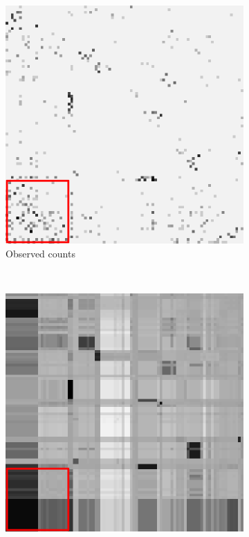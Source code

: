\documentclass{article}
\begin{document}
\begin{figure}[t]
\centering
\begin{subfigure}[b]{0.22\textwidth}
\centering
\includegraphics[scale=.25]{../figs/eckmann-small/parmat/observed}
\caption{Observed counts}
\end{subfigure}
~
\begin{subfigure}[b]{0.22\textwidth}
\centering
\includegraphics[scale=.25]{../figs/eckmann-small/parmat/1}

\end{subfigure}
\end{figure}
\end{document}
